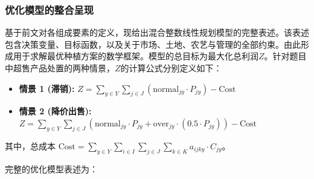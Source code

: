 \subsubsection{优化模型的整合呈现}

基于前文对各组成要素的定义，现给出混合整数线性规划模型的完整表述。该表述包含决策变量、目标函数，以及关于市场、土地、农艺与管理的全部约束。由此形成用于求解最优种植方案的数学框架。模型的总目标为最大化总利润$Z$。针对题目中超售产品处置的两种情景，$Z$的计算公式分别定义如下：
\begin{itemize}
	\item \textbf{情景 1 (滞销):} $Z = \sum_{y \in Y} \sum_{j \in J} (\text{normal}_{jy} \cdot P_{jy}) - \text{Cost}$
	\item \textbf{情景 2 (降价出售):} $Z = \sum_{y \in Y} \sum_{j \in J} (\text{normal}_{jy} \cdot P_{jy} + \text{over}_{jy} \cdot (0.5 \cdot P_{jy})) - \text{Cost}$
\end{itemize}
其中，总成本 $\text{Cost} = \sum_{y \in Y} \sum_{i \in I} \sum_{j \in J} \sum_{k \in K} a_{ijky} \cdot C_{jy}$。

完整的优化模型表述为：


